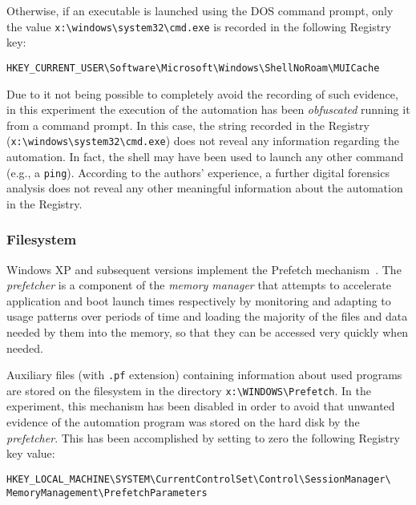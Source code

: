 \documentclass[runningheads]{llncs}
\begin{document}
Otherwise, if an executable is launched using the DOS command prompt, only the value \verb=x:\windows\system32\cmd.exe=
is recorded in the following Registry key:

{%
\begin{verbatim}
HKEY_CURRENT_USER\Software\Microsoft\Windows\ShellNoRoam\MUICache
\end{verbatim}
}

Due to it not being possible to completely avoid the recording of such evidence, in this experiment the execution of the automation has been \emph{obfuscated} running it from a command prompt. In this case, the string recorded in the Registry (\verb=x:\windows\system32\cmd.exe=) does not reveal any information regarding the automation. In fact, the shell may have been used to launch any other command (e.g., a \verb=ping=).
According to the authors' experience, a further digital forensics analysis does not reveal any other meaningful information about the automation in the Registry.

\subsubsection{Filesystem}

Windows XP and subsequent versions implement the Prefetch mechanism~\cite{prefetch}. The \emph{prefetcher} is a component of the \emph{memory manager} that
attempts to accelerate application and boot launch times respectively by monitoring and adapting to usage patterns over periods of time and loading the majority of the files and data needed by them into the memory, so that they can be accessed very quickly when needed.

Auxiliary files (with \verb=.pf= extension) containing information about used programs are stored on the filesystem in the directory \verb=x:\WINDOWS\Prefetch=. In the experiment, this mechanism has been disabled in order to avoid that unwanted evidence of the automation program was stored on the hard disk by the \emph{prefetcher}. This has been accomplished by setting to zero the following Registry key value:

{%
\begin{verbatim}
HKEY_LOCAL_MACHINE\SYSTEM\CurrentControlSet\Control\SessionManager\
MemoryManagement\PrefetchParameters
\end{verbatim}
}
\end{document}

